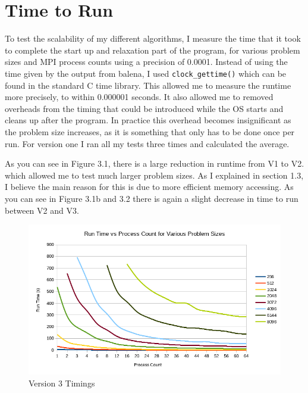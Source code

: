 \documentclass{report}
\begin{document}
\section{Time to Run}
To test the scalability of my different algorithms, I measure the time that it took to complete the start up and relaxation part of the program, for various problem sizes and MPI process counts using a precision of 0.0001. Instead of using the time given by the output from balena, I used \lstinline[style=customc]|clock_gettime()|\lstinline[style=customc]|| which can be found in the standard C time library. This allowed me to measure the runtime more precisely, to within 0.000001 seconds. It also allowed me to removed overheads from the timing that could be introduced while the OS starts and cleans up after the program. In practice this overhead becomes insignificant as the problem size increases, as it is something that only has to be done once per run. For version one I ran all my tests three times and calculated the average.

As you can see in Figure 3.1, there is a large reduction in runtime from V1 to V2. which allowed me to test much larger problem sizes. As I explained in section 1.3,  I believe the main reason for this is due to more efficient memory accessing. As you can see in Figure 3.1b and 3.2 there is again a slight decrease in time to run between V2 and V3.

\begin{figure}[h]
\includegraphics[width=1\textwidth]{Runtime}
\caption{Version 3 Timings}
\label{fig:subim3}
\end{figure}
\pagebreak
\end{document}
